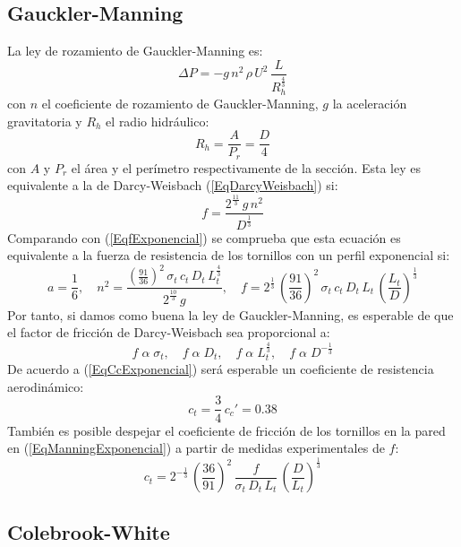 \documentclass[a4paper]{article}
\newcommand{\EQ}[2]{\begin{equation}#1\label{#2}\end{equation}}
\begin{document}
\subsection{Gauckler-Manning}

La ley de rozamiento de Gauckler-Manning es:
\EQ{\Delta P=-g\,n^2\,\rho\,U^2\,\frac{L}{R_h^{\frac43}}}{EqGaucklerManning}
con $n$ el coeficiente de rozamiento de Gauckler-Manning, $g$ la aceleración
gravitatoria y $R_h$ el radio hidráulico:
\EQ{R_h=\frac{A}{P_r}=\frac{D}{4}}{EqRadioHidraulico}
con $A$ y $P_r$ el área y el perímetro respectivamente de la sección. Esta ley
es equivalente a la de Darcy-Weisbach (\ref{EqDarcyWeisbach}) si:
\EQ{f=\frac{2^{\frac{11}{3}}\,g\,n^2}{D^{\frac13}}}{EqDarcyWeisbachManning}
Comparando con (\ref{EqfExponencial}) se comprueba que esta ecuación es
equivalente a la fuerza de resistencia de los tornillos con un perfil
exponencial si:
\EQ
{
  a=\frac16,\quad
  n^2=\frac{\left(\frac{91}{36}\right)^2\,\sigma_t\,c_t\,D_t\,L_t^{\frac43}}
  {2^{\frac{10}{3}}\,g},\quad
  f=2^{\frac13}\,\left(\frac{91}{36}\right)^2\,\sigma_t\,c_t\,D_t\,L_t
  \,\left(\frac{L_t}{D}\right)^{\frac13}
}{EqManningExponencial}
Por tanto, si damos como buena la ley de Gauckler-Manning, es esperable de
que el factor de fricción de Darcy-Weisbach sea proporcional a:
\EQ
{
  f\;\alpha\;\sigma_t,\quad
  f\;\alpha\;D_t,\quad
  f\;\alpha\;L_t^{\frac43},\quad
  f\;\alpha\;D^{-\frac13}
}{EqfExponencialFactoresManning}
De acuerdo a (\ref{EqCcExponencial}) será esperable un coeficiente de
resistencia aerodinámico:
\EQ{c_t=\frac34\,c_c'=0.38}{EqManningcc}
También es posible despejar el coeficiente de fricción de los tornillos en la
pared en (\ref{EqManningExponencial}) a partir de medidas experimentales de $f$:
\EQ
{
  c_t=2^{-\frac13}\,\left(\frac{36}{91}\right)^2\,\frac{f}{\sigma_t\,D_t\,L_t}
  \,\left(\frac{D}{L_t}\right)^{\frac13}
}{EqManningct}

\subsection{Colebrook-White}
\end{document}

